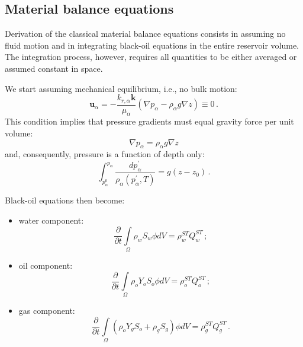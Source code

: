 \documentclass[authoryear,preprint,review,12pt]{elsarticle}
\begin{document}
\subsection{Material balance equations}

Derivation of the classical material balance equations consists in assuming no fluid motion and in integrating black-oil equations in the entire reservoir volume. The integration process, however, requires all quantities to be either averaged or assumed constant in space.




We start assuming mechanical equilibrium, i.e., no bulk motion:
\begin{equation}
\mathbf{u}_\alpha = -\frac{k_{r,\alpha} \mathbf{k}}{\mu_\alpha} \left(\nabla p_\alpha - \rho_\alpha g\nabla z\right)\equiv 0 \, .
\end{equation}
This condition implies that pressure gradients must equal gravity force per unit volume:
\begin{equation}\label{eq: p=rhogh}
\nabla p_\alpha = \rho_\alpha g\nabla z
\end{equation}
and, consequently, pressure is a function of depth only:
\begin{equation}\label{eq: p=rhogh}
\int_{p_\alpha^0}^{p_\alpha} \frac{dp_\alpha^{'}}{\rho_\alpha \left(p_\alpha^{'},T\right)} = g\left(z - z_0\right) \, .
\end{equation}

Black-oil equations then become:
\begin{itemize}
\item water component:
\begin{equation}\label{eq: Sw2}
\frac{\partial}{\partial t} \int\limits_{\Omega} \rho_w S_w \phi dV = \rho_w^{ST}Q_w^{ST} \, ;
\end{equation}

\item oil component:
\begin{equation}\label{eq: So2}
\frac{\partial}{\partial t} \int\limits_{\Omega} \rho_o Y_o S_o \phi dV = \rho_o^{ST}Q_o^{ST} \, ;
\end{equation}

\item gas component:
\begin{equation}\label{eq: Sg2}
\frac{\partial}{\partial t} \int\limits_{\Omega} \left( \rho_o Y_g S_o + \rho_g S_g\right) \phi dV = \rho_g^{ST}Q_g^{ST} \, .
\end{equation}
\end{itemize}
%
\end{document}

